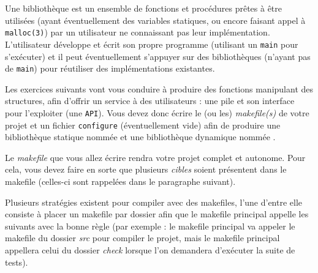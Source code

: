 

\vspace*{0.7cm}

\noindent {}

\bigskip

\noindent Une bibliothèque est un ensemble de fonctions et procédures prêtes à être utilisées (ayant éventuellement des variables statiques, ou encore faisant appel à \texttt{malloc(3)}) par un utilisateur ne connaissant pas leur implémentation.
L'utilisateur développe et écrit son propre programme (utilisant un \texttt{main} pour s'exécuter) et il peut éventuellement s'appuyer sur des bibliothèques (n'ayant pas de \texttt{main}) pour réutiliser des implémentations existantes.

\bigskip

\noindent Les exercices suivants vont vous conduire à produire des fonctions manipulant des structures, afin d'offrir un service à des utilisateurs : une pile et son interface pour l'exploiter (une \texttt{API}).
Vous devez donc écrire le (ou les) \textit{makefile(s)} de votre projet et un fichier \texttt{configure} (éventuellement vide) afin de produire une bibliothèque statique nommée  et une bibliothèque dynamique nommée .

\bigskip

\noindent Le \textit{makefile} que vous allez écrire rendra votre projet complet et autonome.
Pour cela, vous devez faire en sorte que plusieurs \textit{cibles} soient présentent dans le makefile (celles-ci sont rappelées dans le paragraphe suivant).

\bigskip

\noindent Plusieurs stratégies existent pour compiler avec des makefiles, l'une d'entre elle consiste à placer un makefile par dossier afin que le makefile principal appelle les suivants avec la bonne règle (par exemple : le makefile principal va appeler le makefile du dossier \textit{src} pour compiler le projet, mais le makefile principal appellera celui du dossier \textit{check} lorsque l'on demandera d'exécuter la suite de tests).

